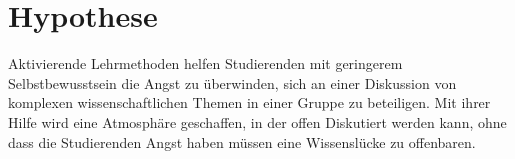 \section{Hypothese}
Aktivierende Lehrmethoden helfen Studierenden mit geringerem Selbstbewusstsein die Angst zu
überwinden, sich an einer Diskussion von komplexen wissenschaftlichen Themen in einer Gruppe zu
beteiligen. Mit ihrer Hilfe wird eine Atmosphäre geschaffen, in der offen Diskutiert werden kann,
ohne dass die Studierenden Angst haben müssen eine Wissenslücke zu offenbaren.